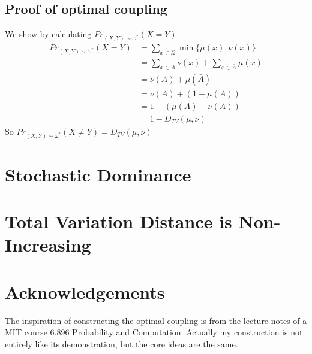 \documentclass[12pt,letterpaper]{article}
\begin{document}
\subsection{Proof of optimal coupling}
We show by calculating $Pr_{(X,Y)\sim\omega^*}(X=Y)$.\\
\begin{align}
  Pr_{(X,Y)\sim\omega^*}(X=Y)&=\sum_{x\in\Omega}\min\{\mu(x),\nu(x)\}\\
  &=\sum_{x\in A}\nu(x)+\sum_{x\in\bar{A}}\mu(x)\\
  &=\nu(A)+\mu(\bar{A})\\
  &=\nu(A)+(1-\mu(A))\\
  &=1-(\mu(A)-\nu(A))\\
  &=1-D_{TV}(\mu,\nu)
\end{align}
So $Pr_{(X,Y)\sim\omega^*}(X\neq Y)=D_{TV}(\mu,\nu)$
\newpage 

\section{Stochastic Dominance}

\section{Total Variation Distance is Non-Increasing}

\section{Acknowledgements}
The inspiration of constructing the optimal coupling is from the lecture notes of a MIT course 6.896 Probability and Computation. Actually my construction is not entirely like its demonstration, but the core ideas are the same.
\end{document}
